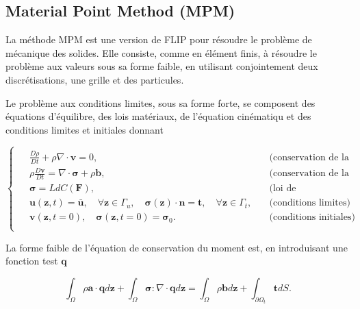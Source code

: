 
\subsection{Material Point Method (MPM)}

La méthode MPM est une version de FLIP pour résoudre le problème de mécanique des solides.
Elle consiste, comme en élément finis, à résoudre le problème aux valeurs sous sa forme faible, en utilisant conjointement deux discrétisations, une grille et des particules.

Le problème aux conditions limites, sous sa forme forte, se composent des équations d'équilibre, des lois matériaux, de l'équation cinématiqu et des conditions limites et initiales donnant

\begin{equation*}
    \begin{cases}
        \begin{aligned}
             & \frac{D \rho}{Dt} + \rho \nabla \cdot \bm v  =  0                          ,                                                                         & \quad \text{(conservation de la masse)}                  \\
             & \rho \frac{D \bm v}{Dt}                      =  \nabla \cdot \bm \sigma + \rho \bm b,                                                                & \quad  \text{(conservation de la quantité de mouvement)} \\
             & \bm \sigma = LdC(\bm F),                                                                                                                             & \quad  \text{(loi de comportement)}                      \\
             & \bm u(\bm z, t) = \bar{\bm u}, \quad \forall \bm z \in \Gamma_u,    \quad  \bm \sigma (\bm z) \cdot \bm n = \bm t, \quad \forall \bm z \in \Gamma_t, & \quad  \text{(conditions limites)}                       \\&\bm v(\bm z, t = 0), \quad \bm \sigma(\bm z, t= 0) = \bm \sigma_0. & \quad  \text{(conditions initiales)} \\
        \end{aligned}
    \end{cases}
\end{equation*}

La forme faible de l'équation de conservation du moment est, en introduisant une fonction test $\bm q$

\begin{equation*}
    \int_\Omega \rho \bm a \cdot \bm q d\bm z + \int_\Omega \bm \sigma : \nabla \cdot \bm q d\bm z = \int_\Omega \rho \bm b d\bm z + \int_{\partial \Omega_t} \bm t dS.
\end{equation*}

